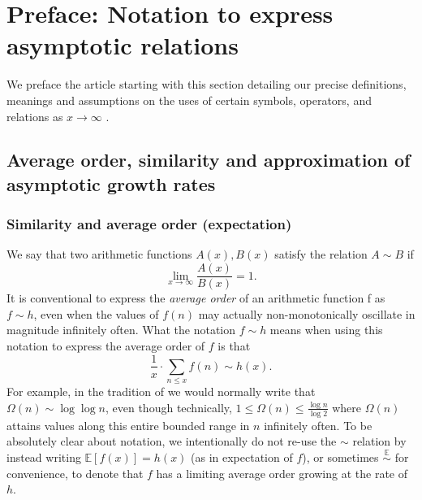 \documentclass[11pt,reqno,a4letter]{article}
\numberwithin{figure}{section}
\numberwithin{table}{section}
\newcommand{\cf}{\textit{cf.\ }}
\theoremstyle{plain}
\numberwithin{theorem}{section}
\theoremstyle{definition}
\begin{document}

\newpage
\label{Appendix_Glossary_NotationConvs}
     \vskip 0in
     \printglossary[type={symbols},
                    title={Glossary of special notation and conventions},
                    style={glossstyleSymbol},
                    nogroupskip=true]



\newpage
\section{Preface: Notation to express asymptotic relations} 

We preface the article starting with this section detailing 
our precise definitions, meanings and assumptions on the uses of certain symbols, operators, and 
relations as $x \rightarrow \infty$ \cite[\cf \S 2]{NISTHB} \cite{ACOMB-BOOK}. 

\subsection{Average order, similarity and approximation of asymptotic growth rates} 

\subsubsection{Similarity and average order (expectation)} 

We say that two arithmetic functions $A(x), B(x)$ satisfy the relation $A \sim B$ if 
\[
\lim_{x \rightarrow \infty} \frac{A(x)}{B(x)} = 1. 
\] 
It is conventional to express the \emph{average order} of an arithmetic function f as 
$f \sim h$, even when the values of $f(n)$ may actually non-monotonically 
oscillate in magnitude infinitely often. What the notation $f \sim h$ means when using this 
notation to express the average order of $f$ is that 
$$\frac{1}{x} \cdot \sum_{n \leq x} f(n) \sim h(x).$$ 
For example, in the tradition of \cite{HARDYWRIGHT} we would normally write that 
$\Omega(n) \sim \log\log n$, even though technically, 
$1 \leq \Omega(n) \leq \frac{\log n}{\log 2}$ where $\Omega(n)$ attains values along this entire bounded 
range in $n$ infinitely often. 
To be absolutely clear about notation, we intentionally do not re-use the $\sim$ relation by 
instead writing $\mathbb{E}[f(x)] = h(x)$ (as in expectation of $f$), or sometimes 
$\overset{\mathbb{E}}{\sim}$ for convenience,  
to denote that $f$ has a limiting average order growing at the 
rate of $h$. 
\end{document}
